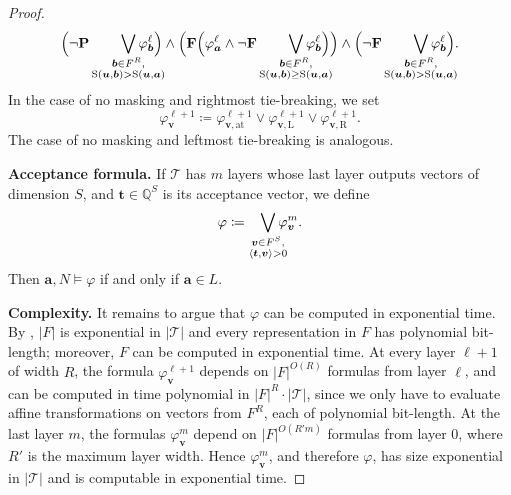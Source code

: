 \documentclass{article} %
\newcommand{\Q}{\mathbb{Q}}
\newcommand{\score}{\mathrm{S}}
\newcommand{\opbf}[1]{\textnormal{\textbf{#1}}}
\newcommand{\past}{\opbf{P}}
\newcommand{\future}{\opbf{F}}
\newcommand{\vecb}{\boldsymbol{b}}
\newcommand{\veca}{\boldsymbol{a}}
\newcommand{\bnfdef}{\coloneqq}
\newcommand{\str}[1]{#1}
\newcommand{\bv}{\boldsymbol{v}}
\newcommand{\bu}{\boldsymbol{u}}
\newcommand{\bword}{\mathbf{a}}
\newcommand{\trans}{\mathcal{T}}
\newcommand{\bt}{\boldsymbol{t}}
\newcommand{\Lang}{L}
\begin{document}
\begin{proof}
\begin{equation}
\Big(\neg\past\smashoperator[r]{\bigvee_{\substack{\vecb \in F^R, \\ \score(\bu, \vecb) > \score(\bu, \veca)}}}
\varphi_{\vecb}^\ell\Big) \wedge
\Big(\future \Big(\varphi_{\veca}^\ell \wedge \neg\future \smashoperator[r]{\bigvee_{\substack{\vecb \in F^R, \\ \score(\bu, \vecb) \ge \score(\bu, \veca)}}}
\varphi_{\vecb}^\ell\Big)\Big) \wedge
\Big(\neg\future \smashoperator[r]{\bigvee_{\substack{\vecb \in F^R, \\ \score(\bu, \vecb) > \score(\bu, \veca)}}}
\varphi_{\vecb}^\ell\Big).
\end{equation}
In the case of no masking and rightmost tie-breaking, we set
\begin{equation}
\varphi_{\bv}^{\ell+1} \bnfdef \varphi_{\bv,\text{at}}^{\ell+1} \vee \varphi_{\bv,\text{L}}^{\ell+1} \vee \varphi_{\bv,\text{R}}^{\ell+1}.
\end{equation}
The case of no masking and leftmost tie-breaking is analogous.

\medskip\noindent\textbf{Acceptance formula.}\quad
If $\trans$ has $m$ layers whose last layer outputs vectors of dimension $S$,
and $\bt \in \Q^S$ is its acceptance vector, we define
\begin{equation}
\varphi \bnfdef \smashoperator[r]{\bigvee_{\substack{\bv \in F^S, \\ \langle \bt, \bv \rangle > 0}}} \varphi_{\bv}^m.
\end{equation}
Then $\str{\bword}, N \models \varphi$ if and only if $\str{\bword} \in \Lang$. 

\medskip\noindent\textbf{Complexity.}\quad
It remains to argue that $\varphi$ can be computed in exponential time.
By , $|F|$ is exponential in $|\trans|$
and every representation in $F$ has polynomial bit-length;
moreover, $F$ can be computed in exponential time.
At every layer $\ell+1$ of width $R$, the formula $\varphi_{\bv}^{\ell+1}$ depends on $|F|^{O(R)}$ formulas from layer $\ell$,
and can be computed in time polynomial in $|F|^R \cdot |\trans|$,
since we only have to evaluate affine transformations on vectors from $F^R$,
each of polynomial bit-length.
At the last layer $m$, the formulas $\varphi_{\bv}^{m}$ depend on $|F|^{O(R' m)}$ formulas from layer $0$,
where $R'$ is the maximum layer width.
Hence $\varphi_{\bv}^{m}$, and therefore $\varphi$, has size exponential in $|\trans|$ and is computable in exponential time.
\end{proof}
\end{document}

